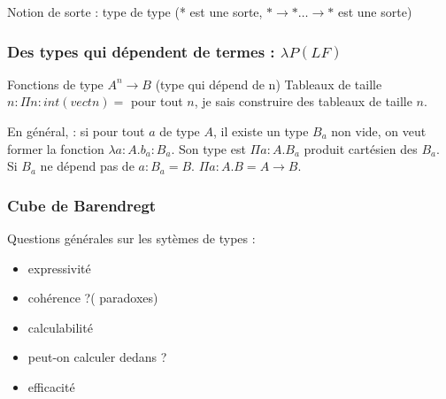 \documentclass[10pt,a4paper]{article}
\begin{document}
Notion de sorte : type de type (* est une sorte, $* → * \dots → *$ est une sorte)\\

\subsubsection{Des types qui dépendent de termes : $\lambda P (LF)$}
Fonctions de type $A^n → B$ (type qui dépend de n)
Tableaux de taille $n : \Pi n : int(vect n) =$ pour tout $n$, je sais construire des tableaux de taille $n$.

En général, : si pour tout $a$ de type $A$, il existe un type $B_a$ non vide, on veut former la fonction $\lambda a : A . b_a : B_a$. Son type est $\Pi a : A.B_a$ produit cartésien des $B_a$.
Si $B_a$ ne dépend pas de $a : B_a = B$.   $\Pi a : A. B = A → B$.

\subsubsection{Cube de Barendregt}

Questions générales sur les sytèmes de types : 
\begin{itemize}
 \item expressivité
 \item cohérence ?( paradoxes)
 \item calculabilité
 \item peut-on calculer dedans ?
 \item efficacité
\end{itemize}
\end{document}
